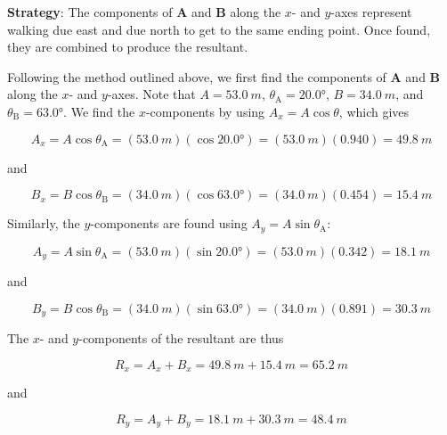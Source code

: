 \documentclass[main-ap-physics.tex]{subfiles}
\begin{document}
\Solution \textbf{Strategy}: The components of \textbf{A} and \textbf{B} along the $x$- and $y$-axes represent walking due east and due north to get to the same ending point. Once found, they are combined to produce the resultant.

\vspace{1em}

Following the method outlined above, we first find the components of \textbf{A} and \textbf{B} along the $x$- and $y$-axes. Note that $A = \SI{53.0}{m}$, $\theta_{\text{A}} = \ang{20.0}$, $B = \SI{34.0}{m}$, and $\theta_{\text{B}} = \ang{63.0}$. We find the $x$-components by using $A_x = A \cos{\theta}$, which gives

\begin{equation*}
    A_x = A \cos{\theta_{\text{A}}} = \left(\SI{53.0}{m}\right) \left(\cos{\ang{20.0}}\right) = \left(\SI{53.0}{m}\right) \left(0.940\right) = \SI{49.8}{m}
\end{equation*}

and

\begin{equation*}
    B_x = B\cos{\theta_{\text{B}}} = \left(\SI{34.0}{m}\right) \left(\cos{\ang{63.0}}\right) = \left(\SI{34.0}{m}\right) \left(0.454\right) = \SI{15.4}{m}
\end{equation*}

Similarly, the $y$-components are found using $A_y = A \sin{\theta_{\text{A}}}$:

\begin{equation*}
    A_y = A \sin{\theta_{\text{A}}} = \left(\SI{53.0}{m}\right) \left(\sin{\ang{20.0}}\right) = \left(\SI{53.0}{m}\right) \left(0.342\right) = \SI{18.1}{m}
\end{equation*}

and

\begin{equation*}
    B_y = B\cos{\theta_{\text{B}}} = \left(\SI{34.0}{m}\right) \left(\sin{\ang{63.0}}\right) = \left(\SI{34.0}{m}\right) \left(0.891\right) = \SI{30.3}{m}
\end{equation*}

The $x$- and $y$-components of the resultant are thus

\begin{equation*}
    R_x = A_x + B_x = \SI{49.8}{m} + \SI{15.4}{m} = \SI{65.2}{m}
\end{equation*}

and 

\begin{equation*}
    R_y = A_y + B_y = \SI{18.1}{m} + \SI{30.3}{m} = \SI{48.4}{m}
\end{equation*}
\end{document}
